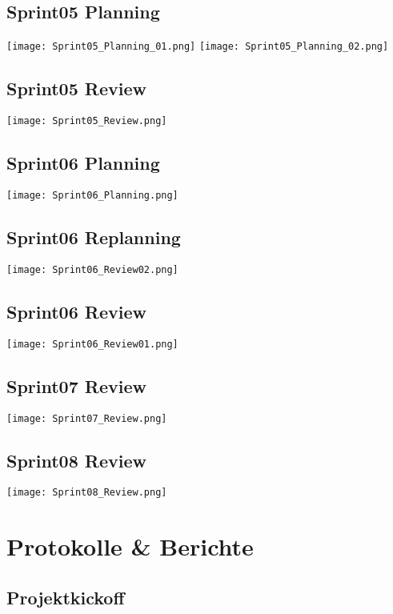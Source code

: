 \newpage
\section*{Sprint05 Planning}
\texttt{[image: Sprint05\_Planning\_01.png]}
\newpage
\noindent
\texttt{[image: Sprint05\_Planning\_02.png]}

\newpage
\section*{Sprint05 Review}
\texttt{[image: Sprint05\_Review.png]}

\newpage
\section*{Sprint06 Planning}
\texttt{[image: Sprint06\_Planning.png]}

\newpage
\section*{Sprint06 Replanning}
\texttt{[image: Sprint06\_Review02.png]}

\newpage
\section*{Sprint06 Review}
\texttt{[image: Sprint06\_Review01.png]}

\newpage
\section*{Sprint07 Review}
\texttt{[image: Sprint07\_Review.png]}

\newpage
\section*{Sprint08 Review}
\texttt{[image: Sprint08\_Review.png]}

\chapter{Protokolle \& Berichte}
\section{Projektkickoff}
\label{app:sec:protokollKickoff}



